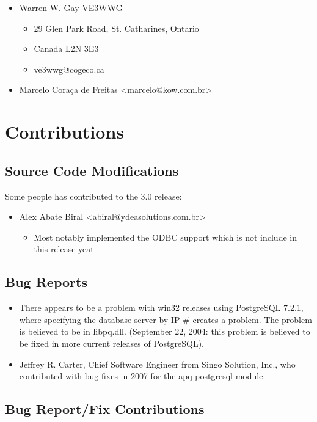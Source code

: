 \documentclass[english,letterpaper]{book}
\begin{document}
\begin{itemize}
\item Warren W. Gay VE3WWG
	\begin{itemize}
		\item 29 Glen Park Road, St. Catharines, Ontario
		\item Canada L2N 3E3
		\item ve3wwg@cogeco.ca
	\end{itemize}
	\item Marcelo Cora\c ca de Freitas <marcelo@kow.com.br>
\end{itemize}


\section*{Contributions}

\subsection*{Source Code Modifications}

Some people has contributed to the 3.0 release:
\begin{itemize}
	\item Alex Abate Biral <abiral@ydeasolutions.com.br>
		\begin{itemize}
			\item Most notably implemented the ODBC support which is not include in this release yeat
		\end{itemize}
\end{itemize}

\subsection*{Bug Reports}

\begin{itemize}
\item There appears to be a problem with win32 releases using PostgreSQL
7.2.1, where specifying the database server by IP \# creates a problem.
The problem is believed to be in libpq.dll. (September 22, 2004: this
problem is believed to be fixed in more current releases of PostgreSQL).
\item Jeffrey R. Carter, Chief Software Engineer from Singo Solution, Inc., 
who contributed with bug fixes in 2007 for the apq-postgresql module.
\end{itemize}


\subsection*{Bug Report/Fix Contributions}
\end{document}

